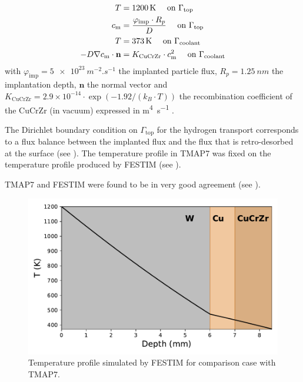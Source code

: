 \begin{subequations}
    \begin{align}
    T &= \SI{1200}{K}\quad \text { on } \Gamma_\mathrm{top}\\
    c_\mathrm{m} &=  \frac{\varphi_\mathrm{imp} \cdot R_p}{D} \quad \text { on } \Gamma_\mathrm{top}\\
    T &= \SI{373}{K} \quad \text { on } \Gamma_\mathrm{coolant}\\
    -D \nabla c_\mathrm{m} \cdot \mathbf{n} &= K_\mathrm{CuCrZr} \cdot c_\mathrm{m}^{2} \quad \text { on } \Gamma_\mathrm{coolant}  
    \end{align}
    \labeq{code comparison BCs}
\end{subequations}
with $\varphi_\mathrm{imp} = \SI{5e23}{m^{-2}.s^{-1}}$ the implanted particle flux, $R_p = \SI{1.25}{nm}$ the implantation depth, $\mathbf{n}$ the normal vector and $K_\mathrm{CuCrZr} = 2.9 \times 10^{-14}\cdot \exp{(-1.92/(k_B\cdot T))}$ the recombination coefficient of the CuCrZr (in vacuum) expressed in \si{m^4.s^{-1}} .

The Dirichlet boundary condition on $\Gamma_\mathrm{top}$ for the hydrogen transport corresponds to a flux balance between the implanted flux and the flux that is retro-desorbed at the surface (see ).
The temperature profile in TMAP7 was fixed on the temperature profile produced by FESTIM (see ).

TMAP7 and FESTIM were found to be in very good agreement (see ).

\begin{figure} [h]
    \centering
    \includegraphics[width=0.5\linewidth]{Figures/Chapter3/monoblocks/interface_condition/iter case/temperature_1D.pdf}
    \caption{Temperature profile simulated by FESTIM for comparison case with TMAP7.}
\end{figure}

